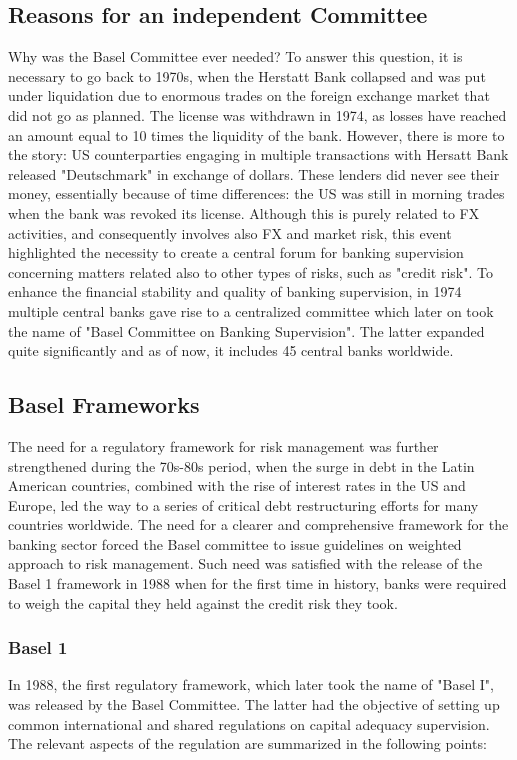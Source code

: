 \documentclass[a4paper,12pt]{article}
\begin{document}
    \subsection{Reasons for an independent Committee}
    Why was the Basel Committee ever needed? 
    To answer this question, it is necessary to go back to 1970s, 
    when the Herstatt Bank collapsed and was put under liquidation due to 
    enormous trades on the foreign exchange market that did not go as planned. 
    The license was withdrawn in 1974, as losses have reached an amount equal to 
    10 times the liquidity of the bank. However, there is more to the story: 
    US counterparties engaging in multiple transactions with Hersatt Bank released 
    "Deutschmark" in exchange of dollars.
    These lenders did never see their money, essentially because of time differences: 
    the US was still in morning trades when the bank was revoked its license. 
    Although this is purely related to FX activities, and consequently involves 
    also FX and market risk, this event highlighted the necessity to create a 
    central forum for banking supervision concerning matters related also to 
    other types of risks, such as "credit risk". To enhance the financial stability 
    and quality of banking supervision, in 1974 multiple central banks gave rise to a 
    centralized committee which later on took the name of "Basel Committee on 
    Banking Supervision". The latter expanded quite significantly and as of now, 
    it includes 45 central banks worldwide.

    \subsection{Basel Frameworks}

    The need for a regulatory framework for risk management was further strengthened 
    during the 70s-80s period, when the surge in debt in the Latin American countries, 
    combined with the rise of interest rates in the US and Europe, led the way to a 
    series of critical debt restructuring efforts for many countries worldwide. 
    The need for a clearer and comprehensive framework for the banking sector 
    forced the Basel committee to issue guidelines on weighted approach to risk management. Such need was satisfied with the release of the Basel 1 framework in 1988 when for the first time in history, banks were required to weigh the capital they held against the credit risk they took. 
    
    \subsubsection[]{Basel 1}
    In 1988, the first regulatory framework, which later took the name of "Basel I", 
    was released by the Basel Committee. The latter had the objective of setting up 
    common international and shared regulations on capital adequacy supervision. 
    The relevant aspects of the regulation are summarized in the following points:
    
\end{document}
